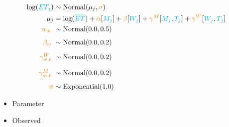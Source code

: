\documentclass[aspectratio=169,xcolor=svgnames]{beamer}
\begin{document}
\begin{frame}
  \begin{align*}
    \log(\observed{ET_j}) &\sim \text{Normal}(\mu_j, \parameter{\sigma})\\
    \mu_j &= \log(\observed{\overline{ET}}) + \parameter{\alpha}[\observed{M_j}] + \parameter{\beta}[\observed{W_j}] + \parameter{\gamma^{M}}[\observed{M_j}, \observed{T_j}] + \parameter{\gamma^{W}}[\observed{W_j}, \observed{T_j}]\\
    \markmath{alpha}{\parameter{\alpha_m}} &\sim \normal{0.0, 0.5}\\
    \markmath{beta}{\parameter{\beta_w}} &\sim \normal{0.0, 0.2}\\
    \markmath{gamma}{\parameter{\gamma^{W}_{w,t}}} &\sim \normal{0.0, 0.2}\\
    \markmath{gamma}{\parameter{\gamma^{M}_{m,t}}} &\sim \normal{0.0, 0.2}\\
    \parameter{\sigma} &\sim \exponential{1.0}\\
  \end{align*}

  \begin{itemize}
  \item {} Parameter
  \item {} Observed
  \end{itemize}
\end{frame}
\end{document}
